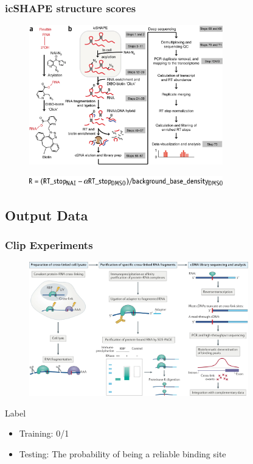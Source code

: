 \documentclass{ctexbeamer}
\begin{document}
\begin{frame}
  \frametitle{icSHAPE structure scores}
  \begin{figure}[H]
    \includegraphics[width=0.75\textwidth]{./figures/shape.png}
    \label{fig:icshape}
  \end{figure}
    \begin{figure}[H]
    \includegraphics[width=0.75\textwidth]{./figures/score.png}
    \label{fig:score}
  \end{figure}
\end{frame}

\subsection{Output Data}
\begin{frame}
  \frametitle{Clip Experiments}
  \begin{figure}[H]
    \center
    \includegraphics[width=0.85\textwidth]{./figures/clip.png}
    \label{fig:clip}
  \end{figure}
  \begin{block}{Label}
  \begin{itemize}
    \item Training: 0/1
    \item Testing: The probability of being a reliable binding site
  \end{itemize} 
  \end{block}
\end{frame}
\end{document}
